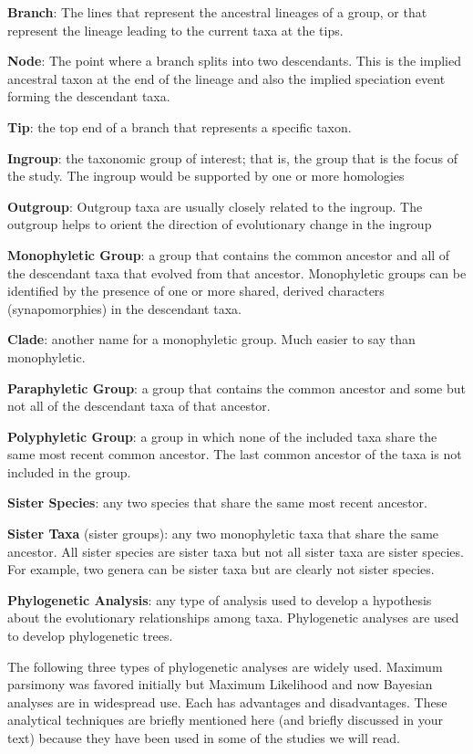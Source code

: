 \documentclass[letterpaper]{tufte-handout}
\begin{document}
\textbf{Branch}: The lines that represent the ancestral lineages of a group, or that represent the lineage leading to the current taxa at the tips.

\textbf{Node}: The point where a branch splits into two descendants.  This is the implied ancestral taxon at the end of the lineage and also the implied speciation event forming the descendant taxa.

\textbf{Tip}: the top end of a branch that represents a specific taxon.

\textbf{Ingroup}: the taxonomic group of interest; that is, the group that is the focus of the study. The ingroup would be supported by one or more homologies

\textbf{Outgroup}: Outgroup taxa are usually closely related to the ingroup.  The outgroup helps to orient the direction of evolutionary change in the ingroup

\textbf{Monophyletic Group}: a group that contains the common ancestor and all of the descendant taxa that evolved from that ancestor. Monophyletic groups can be identified by the presence of one or more shared, derived characters (synapomorphies) in the descendant taxa.

\textbf{Clade}: another name for a monophyletic group.  Much easier to say than monophyletic.

\textbf{Paraphyletic Group}: a group that contains the common ancestor and some but not all of the descendant taxa of that ancestor. 

\textbf{Polyphyletic Group}: a group in which none of the included taxa share the same most recent common ancestor.  The last common ancestor of the taxa is not included in the group.

\textbf{Sister Species}: any two species that share the same most recent ancestor. 

\textbf{Sister Taxa} (sister groups): any two monophyletic taxa that share the same ancestor. All sister species are sister taxa but not all sister taxa are sister species. For example, two genera can be sister taxa but are clearly not sister species.

\textbf{Phylogenetic Analysis}: any type of analysis used to develop a hypothesis about the evolutionary relationships among taxa.  Phylogenetic analyses are used to develop phylogenetic trees. 

The following three types of phylogenetic analyses are widely used. Maximum parsimony was favored initially but Maximum Likelihood and now Bayesian analyses are in widespread use. Each has advantages and disadvantages. These analytical techniques are briefly mentioned here (and briefly discussed in your text) because they have been used in some of the studies we will read.
\end{document}
